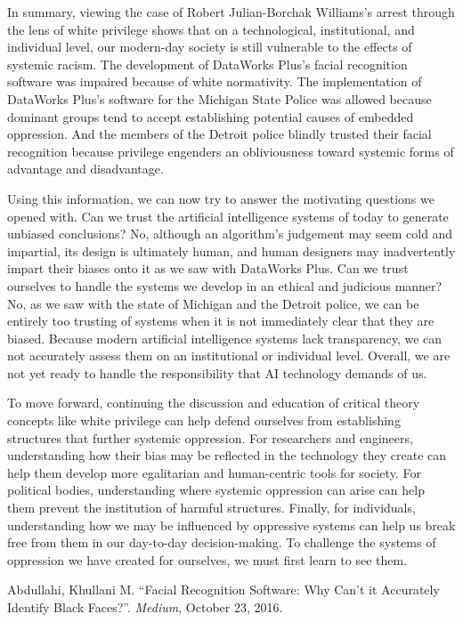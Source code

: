 \documentclass[12pt, letterpaper]{article}
\begin{document}
\begin{mla}
In summary, viewing the case of Robert Julian-Borchak Williams's arrest
through the lens of white privilege shows that on a technological,
institutional, and individual level, our modern-day society is still
vulnerable to the effects of systemic racism. The development of DataWorks
Plus's facial recognition software was impaired because of white normativity.
The implementation of DataWorks Plus's software for the Michigan State Police
was allowed because dominant groups tend to accept establishing potential
causes of embedded oppression. And the members of the Detroit police blindly
trusted their facial recognition because privilege engenders an obliviousness
toward systemic forms of advantage and disadvantage.

Using this information, we can now try to answer the motivating questions we
opened with. Can we trust the artificial intelligence systems of today to
generate unbiased conclusions? No, although an algorithm's judgement may seem
cold and impartial, its design is ultimately human, and human designers may
inadvertently impart their biases onto it as we saw with DataWorks Plus. Can
we trust ourselves to handle the systems we develop in an ethical and
judicious manner? No, as we saw with the state of Michigan and the Detroit
police, we can be entirely too trusting of systems when it is not immediately
clear that they are biased. Because modern artificial intelligence systems
lack transparency, we can not accurately assess them on an institutional or
individual level. Overall, we are not yet ready to handle the responsibility
that AI technology demands of us.

To move forward, continuing the discussion and education of critical theory
concepts like white privilege can help defend ourselves from establishing
structures that further systemic oppression. For researchers and engineers,
understanding how their bias may be reflected in the technology they create
can help them develop more egalitarian and human-centric tools for society.
For political bodies, understanding where systemic oppression can arise can
help them prevent the institution of harmful structures. Finally, for
individuals, understanding how we may be influenced by oppressive systems can
help us break free from them in our day-to-day decision-making. To challenge
the systems of oppression we have created for ourselves, we must first learn
to see them.


\begin{workscited}
	\bibent Abdullahi, Khullani M. ``Facial Recognition Software: Why Can’t it
	Accurately Identify Black Faces?''. \textit{Medium}, October 23, 2016.


\end{workscited}
\end{mla}
\end{document}
